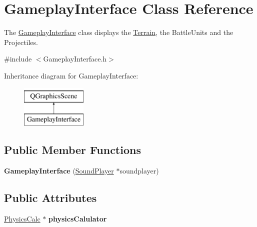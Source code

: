 \hypertarget{class_gameplay_interface}{}\section{Gameplay\+Interface Class Reference}
\label{class_gameplay_interface}


The \hyperlink{class_gameplay_interface}{Gameplay\+Interface} class displays the \hyperlink{class_terrain}{Terrain}, the Battle\+Units and the Projectiles.  




{\ttfamily \#include $<$Gameplay\+Interface.\+h$>$}

Inheritance diagram for Gameplay\+Interface\+:\begin{figure}[H]
\begin{center}
\leavevmode
\includegraphics[height=2.000000cm]{class_gameplay_interface}
\end{center}
\end{figure}
\subsection*{Public Member Functions}
\begin{DoxyCompactItemize}
\item 
{\bfseries Gameplay\+Interface} (\hyperlink{class_sound_player}{Sound\+Player} $\ast$soundplayer)\hypertarget{class_gameplay_interface_ab75b8894a36f5697edc87e0acc2d31ce}{}\label{class_gameplay_interface_ab75b8894a36f5697edc87e0acc2d31ce}

\end{DoxyCompactItemize}
\subsection*{Public Attributes}
\begin{DoxyCompactItemize}
\item 
\hyperlink{class_physics_calc}{Physics\+Calc} $\ast$ {\bfseries physics\+Calulator}\hypertarget{class_gameplay_interface_adf09add3928dd254e051c3ecc070bee6}{}\label{class_gameplay_interface_adf09add3928dd254e051c3ecc070bee6}

\end{DoxyCompactItemize}


